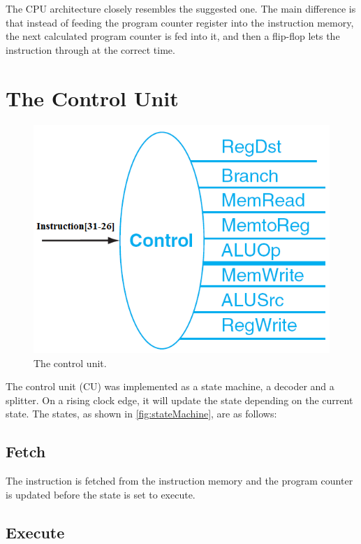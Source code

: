 The CPU architecture closely resembles the suggested one.
The main difference is that instead of feeding the program counter register into the instruction memory, %
the next calculated program counter is fed into it, and then a flip-flop lets the instruction through at the correct time.

\section{The Control Unit}
\begin{figure}[ht]
    \centering
    \includegraphics[scale=0.3]{figures/controlunit.png}
    \caption{\label{fig:controlUnit}The control unit.}
\end{figure}

The control unit (CU) was implemented as a state machine, a decoder and a splitter.
On a rising clock edge, it will update the state depending on the current
state. The states, as shown in \ref{fig:stateMachine}, are as follows:

\subsection{Fetch}

The instruction is fetched from the instruction memory
and the program counter is updated before the state is set to execute.

\subsection{Execute}

